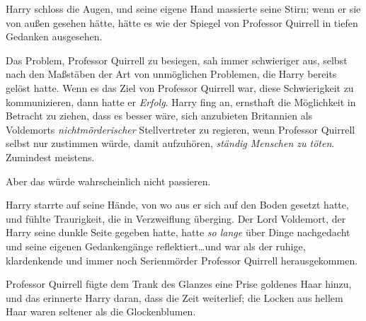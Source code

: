 Harry schloss die Augen, und seine eigene Hand massierte seine Stirn; wenn er sie von außen gesehen hätte, hätte es wie der Spiegel von Professor Quirrell in tiefen Gedanken ausgesehen.

Das Problem, Professor Quirrell zu besiegen, sah immer schwieriger aus, selbst nach den Maßstäben der Art von unmöglichen Problemen, die Harry bereits gelöst hatte. Wenn es das Ziel von Professor Quirrell war, diese Schwierigkeit zu kommunizieren, dann hatte er \emph{Erfolg}.
Harry fing an, ernsthaft die Möglichkeit in Betracht zu ziehen, dass es besser wäre, sich anzubieten Britannien als Voldemorts \emph{nichtmörderischer} Stellvertreter zu regieren, wenn Professor Quirrell selbst nur zustimmen würde, damit aufzuhören, \emph{ständig Menschen zu töten}. Zumindest meistens.

Aber das würde wahrscheinlich nicht passieren.

Harry starrte auf seine Hände, von wo aus er sich auf den Boden gesetzt hatte, und fühlte Traurigkeit, die in Verzweiflung überging.
Der Lord Voldemort, der Harry seine dunkle Seite gegeben hatte, hatte \emph{so lange} über Dinge nachgedacht und seine eigenen Gedankengänge reflektiert…und war als der ruhige, klardenkende und immer noch Serienmörder Professor Quirrell herausgekommen.

Professor Quirrell fügte dem Trank des Glanzes eine Prise goldenes Haar hinzu, und das erinnerte Harry daran, dass die Zeit weiterlief; die Locken aus hellem Haar waren seltener als die Glockenblumen.

